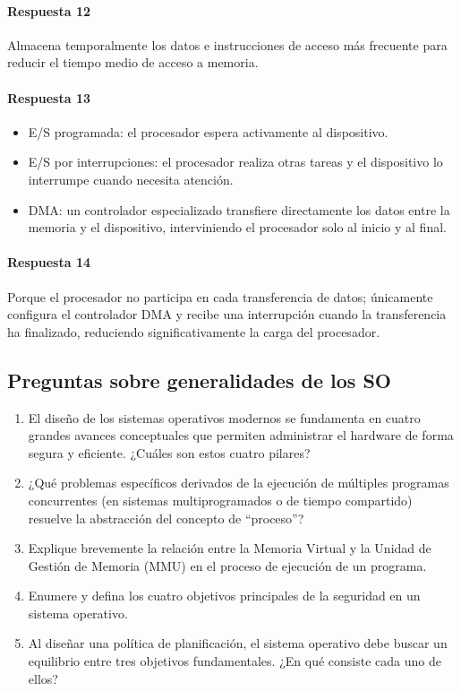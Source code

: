 \paragraph{Respuesta 12} Almacena temporalmente los datos e instrucciones de acceso más frecuente para reducir el tiempo medio de acceso a memoria.

\paragraph{Respuesta 13}
\begin{itemize}
  \item E/S programada: el procesador espera activamente al dispositivo.
  \item E/S por interrupciones: el procesador realiza otras tareas y el dispositivo lo interrumpe cuando necesita atención.
  \item DMA: un controlador especializado transfiere directamente los datos entre la memoria y el dispositivo, interviniendo el procesador solo al inicio y al final.
\end{itemize}

\paragraph{Respuesta 14} Porque el procesador no participa en cada transferencia de datos; únicamente configura el controlador DMA y recibe una interrupción cuando la transferencia ha finalizado, reduciendo significativamente la carga del procesador.

\subsection{Preguntas sobre generalidades de los SO}

\begin{enumerate}
\item El diseño de los sistemas operativos modernos se fundamenta en cuatro grandes avances conceptuales que permiten administrar el hardware de forma segura y eficiente. ¿Cuáles son estos cuatro pilares?
\item ¿Qué problemas específicos derivados de la ejecución de múltiples programas concurrentes (en sistemas multiprogramados o de tiempo compartido) resuelve la abstracción del concepto de ``proceso''?
\item Explique brevemente la relación entre la Memoria Virtual y la Unidad de Gestión de Memoria (MMU) en el proceso de ejecución de un programa.
\item Enumere y defina los cuatro objetivos principales de la seguridad en un sistema operativo.
\item Al diseñar una política de planificación, el sistema operativo debe buscar un equilibrio entre tres objetivos fundamentales. ¿En qué consiste cada uno de ellos?
\end{enumerate}

